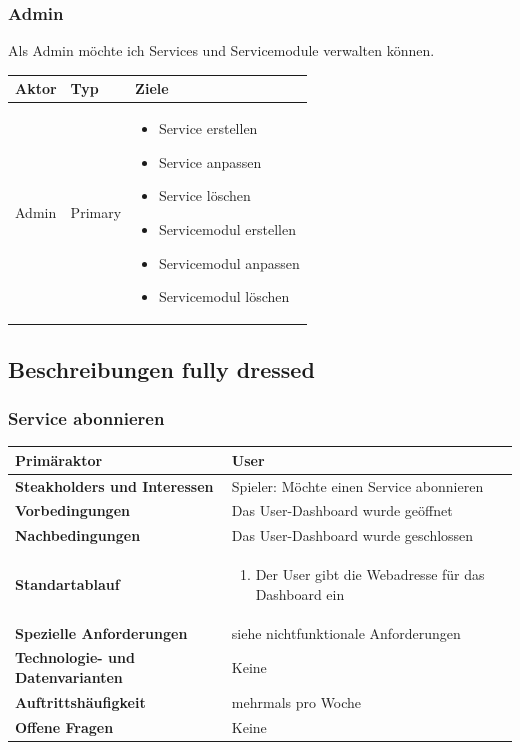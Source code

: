 \documentclass[11pt]{scrartcl}
\begin{document}
\subsubsection{Admin}
Als Admin möchte ich Services und Servicemodule verwalten können.
\\
\begin{tabularx}{\linewidth}{l l X }
  \textbf{Aktor} & \textbf{Typ} & \textbf{Ziele}\\
  \hline
  Admin & Primary & 
  \begin{minipage}{5in}
  \vskip 4pt
  \begin{itemize}
    \item Service erstellen
    \item Service anpassen
    \item Service löschen
    \item Servicemodul erstellen
    \item Servicemodul anpassen
    \item Servicemodul löschen
  \end{itemize}
  \vskip 4pt
 \end{minipage}\\
 \hline
\end{tabularx}


\subsection{Beschreibungen fully dressed}
\subsubsection{Service abonnieren}
\begin{longtabu} to \textwidth {X[1,l] X[2,l]}
	\bfseries Primäraktor & User  \\\hline 
	\bfseries Steakholders und Interessen & Spieler: Möchte einen Service abonnieren  \\\hline 
	\bfseries Vorbedingungen & Das User-Dashboard wurde geöffnet  \\\hline 
	\bfseries Nachbedingungen & Das User-Dashboard wurde geschlossen  \\\hline 
	\bfseries Standartablauf & 
		\begin{enumerate}
			\item Der User gibt die Webadresse für das Dashboard ein
			
		\end{enumerate}
      \\\hline
	\bfseries Spezielle Anforderungen & siehe nichtfunktionale Anforderungen  \\\hline 
	\bfseries Technologie- und Datenvarianten & Keine  \\\hline 
	\bfseries Auftrittshäufigkeit & mehrmals pro Woche  \\\hline 
	\bfseries Offene Fragen & Keine  \\\hline  
\end{longtabu}
\end{document}
